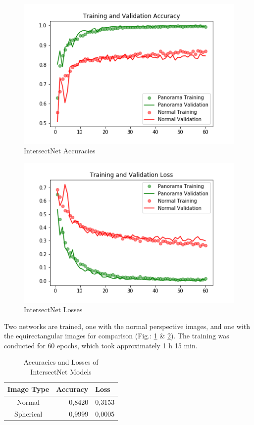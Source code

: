 \documentclass[sigconf, nonacm]{acmart}
\begin{document}
\begin{figure}[h]
  \centering
  \includegraphics[width=\linewidth]{intersectNet_0831-0849_Accuracy}
  \caption{IntersectNet Accuracies}
  \label{fig:IntersectNetAcc}
\end{figure}

\begin{figure}[h]
  \centering
  \includegraphics[width=\linewidth]{intersectNet_0831-0849_Loss}
  \caption{IntersectNet Losses}
  \label{fig:IntersectNetLoss}
\end{figure}

Two networks are trained, one with the normal perspective images, and one with the equirectangular images for comparison (Fig.: \ref{fig:IntersectNetAcc} \& \ref{fig:IntersectNetLoss}).
The training was conducted for 60 epochs, which took approximately 1 h 15 min.

\begin{table}[h]
  \caption{Accuracies and Losses of IntersectNet Models}
  \label{tab:IntersectNetAccLoss}
  \begin{tabular}{ c | r | l }
    \toprule
    Image Type & Accuracy & Loss \\
    \midrule
    Normal & 0,8420 & 0,3153 \\
	Spherical & 0,9999 & 0,0005 \\
  	\bottomrule
  \end{tabular}
\end{table}
\end{document}
